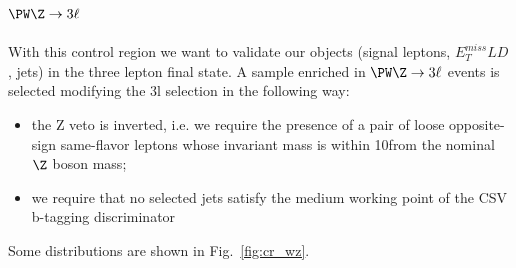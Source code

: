 
%
\clearpage

\subsection{\texorpdfstring{$\PW\Z\to3\ell$}{WZ->3l}} \label{sec:WZ control region}
With this control region we want to validate our objects (signal
leptons, $E_{T}^{miss}LD$, jets) in the three lepton final
state.
A sample enriched in $\PW\Z\to3\ell$ events is selected modifying the 3l selection in the following way:
\begin{itemize}
\item the Z veto is inverted, i.e. we require the presence of a pair of loose opposite-sign same-flavor leptons
whose invariant mass is within 10\GeV from the nominal $\Z$ boson mass;
\item we require that no selected jets satisfy the medium working point of the CSV b-tagging discriminator
\end{itemize}
Some distributions are shown in Fig.~\ref{fig:cr_wz}.


